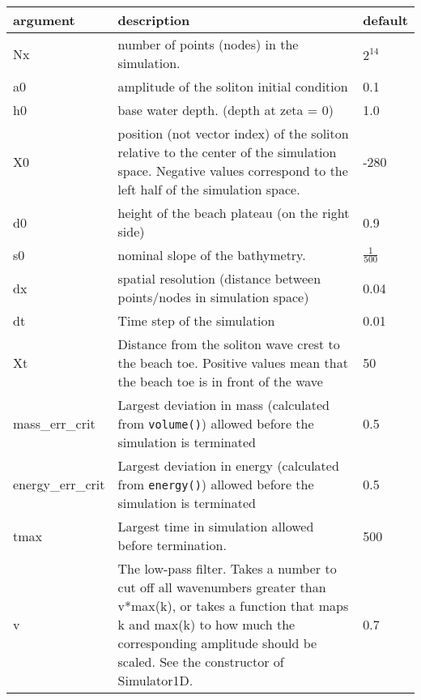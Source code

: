 \documentclass[10pt,a4paper]{article}
\newenvironment{optarglist}
    {\begin{center}
    \begin{tabular}{l|p{10cm}|l}
    argument & description & default\\
    \hline
    }
    { 
    \end{tabular} 
    \end{center}
    }
\begin{document}
\begin{optarglist}
    Nx &
           number of points (nodes) in the simulation.& $2^{14}$ \\\hline
    
    a0  &    
           amplitude of the soliton initial condition & 0.1\\\hline

    h0      &  
           base water depth. (depth at zeta = 0)& 1.0\\\hline

    X0    &   
           position (not vector index) of the soliton relative to the center
            of the simulation space. Negative values correspond to the left
            half of the simulation space.& -280 \\\hline

    d0         &  
           height of the beach plateau (on the right side)& 0.9\\\hline

    s0      &     
           nominal slope of the bathymetry.&$\frac{1}{500}$ \\\hline

    dx     &   
           spatial resolution (distance between points/nodes in simulation
            space)& 0.04\\\hline
    
    dt    &  
           Time step of the simulation& 0.01\\\hline
    
    Xt   &    
           Distance from the soliton wave crest to the beach toe. Positive
            values mean that the beach toe is in front of the wave& 50\\\hline

    mass\_err\_crit &
           Largest deviation in mass (calculated from \texttt{volume()}) allowed before the
            simulation is terminated& 0.5\\\hline
            
    energy\_err\_crit&
           Largest deviation in energy (calculated from \texttt{energy()}) allowed before the
            simulation is terminated& 0.5 \\\hline
    
    tmax      &   
           Largest time in simulation allowed before termination.&500 \\\hline

    v         & 
           The low-pass filter. Takes a number to cut off all wavenumbers
            greater than v*max(k), or takes a function that maps k and max(k)
            to how much the corresponding amplitude should be scaled. See
            the constructor of Simulator1D.& 0.7 \\\hline
    

\end{optarglist}
\end{document}
